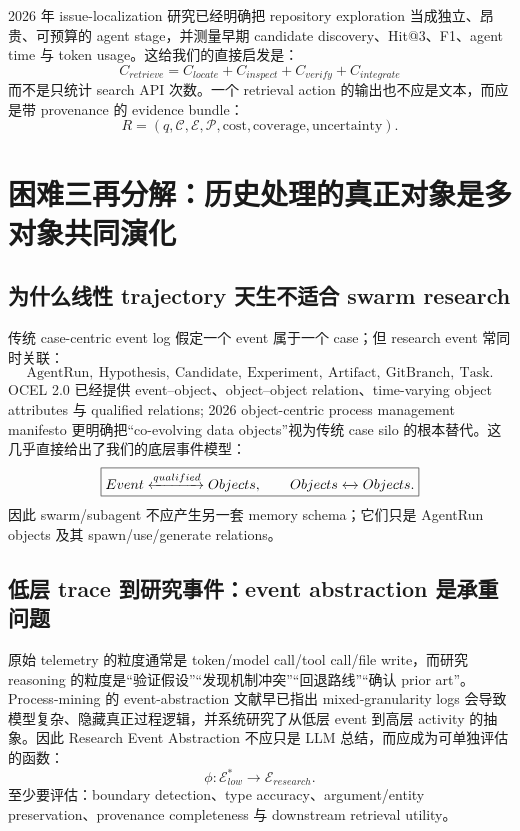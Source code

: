 \documentclass[11pt,a4paper]{ctexart}
\begin{document}
2026 年 issue-localization 研究已经明确把 repository exploration 当成独立、昂贵、可预算的 agent stage，并测量早期 candidate discovery、Hit@3、F1、agent time 与 token usage\cite{awad2026exploration}。这给我们的直接启发是：
\begin{equation}
\boxed{
C_{retrieve}=C_{locate}+C_{inspect}+C_{verify}+C_{integrate}
}
\end{equation}
而不是只统计 search API 次数。一个 retrieval action 的输出也不应是文本，而应是带 provenance 的 evidence bundle：
\begin{equation}
R=(q,\mathcal C,\mathcal E,\mathcal P,\text{cost},\text{coverage},\text{uncertainty}).
\end{equation}

\section{困难三再分解：历史处理的真正对象是多对象共同演化}

\subsection{为什么线性 trajectory 天生不适合 swarm research}

传统 case-centric event log 假定一个 event 属于一个 case；但 research event 常同时关联：
\[
\text{AgentRun},\ \text{Hypothesis},\ \text{Candidate},\ \text{Experiment},\ \text{Artifact},\ \text{GitBranch},\ \text{Task}.
\]
OCEL 2.0 已经提供 event--object、object--object relation、time-varying object attributes 与 qualified relations\cite{ocel2023}; 2026 object-centric process management manifesto 更明确把“co-evolving data objects”视为传统 case silo 的根本替代\cite{seidel2026ocpm}。这几乎直接给出了我们的底层事件模型：
\begin{equation}
\boxed{
Event\xleftrightarrow{qualified}Objects,
\qquad Objects\xleftrightarrow{}Objects.
}
\end{equation}
因此 swarm/subagent 不应产生另一套 memory schema；它们只是 AgentRun objects 及其 spawn/use/generate relations。

\subsection{低层 trace 到研究事件：event abstraction 是承重问题}

原始 telemetry 的粒度通常是 token/model call/tool call/file write，而研究 reasoning 的粒度是“验证假设”“发现机制冲突”“回退路线”“确认 prior art”。Process-mining 的 event-abstraction 文献早已指出 mixed-granularity logs 会导致模型复杂、隐藏真正过程逻辑，并系统研究了从低层 event 到高层 activity 的抽象\cite{vanzelst2021abstraction}。因此 Research Event Abstraction 不应只是 LLM 总结，而应成为可单独评估的函数：
\begin{equation}
\phi:\mathcal E_{low}^{*}\to \mathcal E_{research}.
\end{equation}
至少要评估：boundary detection、type accuracy、argument/entity preservation、provenance completeness 与 downstream retrieval utility。
\end{document}
